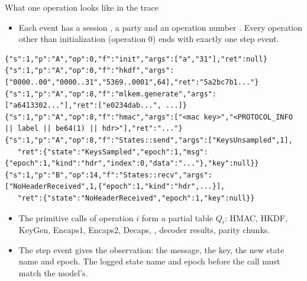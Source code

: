 \begin{frame}[t,fragile]{What one operation looks like in the trace}
  \footnotesize
  \vspace{0.4em}
  \begin{itemize}\footnotesize
    \item Each event has a session , a party  and an operation number .
      Every operation other than initialization (operation 0) ends with exactly one step event.
  \end{itemize}
  \vspace{0.3em}
{\fontsize{6.5}{7.5}\selectfont
\begin{verbatim}
{"s":1,"p":"A","op":0,"f":"init","args":["a","31"],"ret":null}
{"s":1,"p":"A","op":0,"f":"hkdf","args":["0000..00","0000..31","5369..0001",64],"ret":"5a2bc7b1..."}
{"s":1,"p":"A","op":8,"f":"mlkem.generate","args":["a6413302..."],"ret":["e0234dab...", ...]}
{"s":1,"p":"A","op":8,"f":"hmac","args":["<mac key>","<PROTOCOL_INFO || label || be64(1) || hdr>"],"ret":"..."}
{"s":1,"p":"A","op":8,"f":"States::send","args":["KeysUnsampled",1],
   "ret":{"state":"KeysSampled","epoch":1,"msg":{"epoch":1,"kind":"hdr","index":0,"data":"..."},"key":null}}
{"s":1,"p":"B","op":14,"f":"States::recv","args":["NoHeaderReceived",1,{"epoch":1,"kind":"hdr",...}],
   "ret":{"state":"NoHeaderReceived","epoch":1,"key":null}}
\end{verbatim}
}
  \vspace{0.3em}
  \begin{itemize}\footnotesize
    \item The primitive calls of operation $i$ form a partial table $Q_i$: HMAC, HKDF, KeyGen,
      Encaps1, Encaps2, Decaps, , decoder results, parity chunks.
    \item The step event gives the observation: the message, the key, the new state name and
      epoch. The logged state name and epoch before the call must match the model's.
  \end{itemize}
\end{frame}

